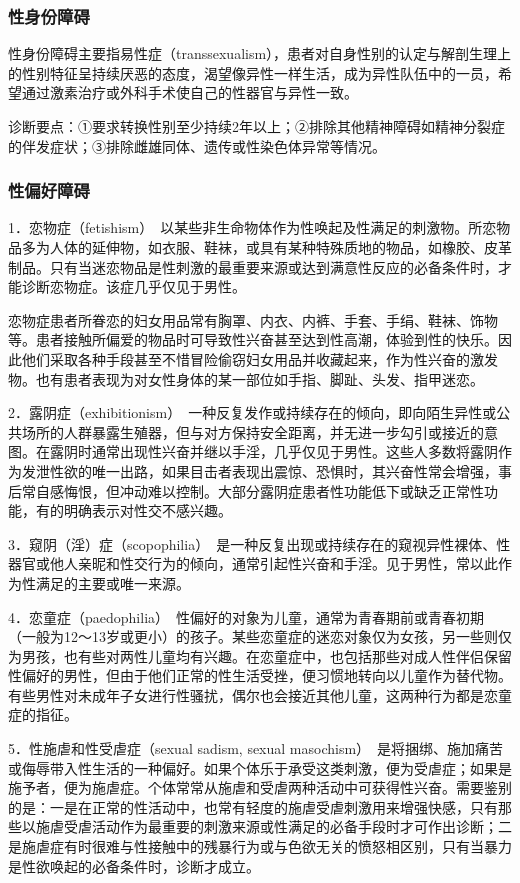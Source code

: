 \subsubsection{性身份障碍}

性身份障碍主要指易性症（transsexualism），患者对自身性别的认定与解剖生理上的性别特征呈持续厌恶的态度，渴望像异性一样生活，成为异性队伍中的一员，希望通过激素治疗或外科手术使自己的性器官与异性一致。

诊断要点：①要求转换性别至少持续2年以上；②排除其他精神障碍如精神分裂症的伴发症状；③排除雌雄同体、遗传或性染色体异常等情况。

\subsubsection{性偏好障碍}

1．恋物症（fetishism）　以某些非生命物体作为性唤起及性满足的刺激物。所恋物品多为人体的延伸物，如衣服、鞋袜，或具有某种特殊质地的物品，如橡胶、皮革制品。只有当迷恋物品是性刺激的最重要来源或达到满意性反应的必备条件时，才能诊断恋物症。该症几乎仅见于男性。

恋物症患者所眷恋的妇女用品常有胸罩、内衣、内裤、手套、手绢、鞋袜、饰物等。患者接触所偏爱的物品时可导致性兴奋甚至达到性高潮，体验到性的快乐。因此他们采取各种手段甚至不惜冒险偷窃妇女用品并收藏起来，作为性兴奋的激发物。也有患者表现为对女性身体的某一部位如手指、脚趾、头发、指甲迷恋。

2．露阴症（exhibitionism）　一种反复发作或持续存在的倾向，即向陌生异性或公共场所的人群暴露生殖器，但与对方保持安全距离，并无进一步勾引或接近的意图。在露阴时通常出现性兴奋并继以手淫，几乎仅见于男性。这些人多数将露阴作为发泄性欲的唯一出路，如果目击者表现出震惊、恐惧时，其兴奋性常会增强，事后常自感悔恨，但冲动难以控制。大部分露阴症患者性功能低下或缺乏正常性功能，有的明确表示对性交不感兴趣。

3．窥阴（淫）症（scopophilia）　是一种反复出现或持续存在的窥视异性裸体、性器官或他人亲昵和性交行为的倾向，通常引起性兴奋和手淫。见于男性，常以此作为性满足的主要或唯一来源。

4．恋童症（paedophilia）　性偏好的对象为儿童，通常为青春期前或青春初期（一般为12～13岁或更小）的孩子。某些恋童症的迷恋对象仅为女孩，另一些则仅为男孩，也有些对两性儿童均有兴趣。在恋童症中，也包括那些对成人性伴侣保留性偏好的男性，但由于他们正常的性生活受挫，便习惯地转向以儿童作为替代物。有些男性对未成年子女进行性骚扰，偶尔也会接近其他儿童，这两种行为都是恋童症的指征。

5．性施虐和性受虐症（sexual sadism, sexual
masochism）　是将捆绑、施加痛苦或侮辱带入性生活的一种偏好。如果个体乐于承受这类刺激，便为受虐症；如果是施予者，便为施虐症。个体常常从施虐和受虐两种活动中可获得性兴奋。需要鉴别的是：一是在正常的性活动中，也常有轻度的施虐受虐刺激用来增强快感，只有那些以施虐受虐活动作为最重要的刺激来源或性满足的必备手段时才可作出诊断；二是施虐症有时很难与性接触中的残暴行为或与色欲无关的愤怒相区别，只有当暴力是性欲唤起的必备条件时，诊断才成立。

